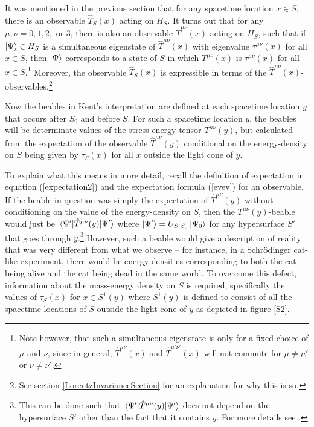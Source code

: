 It was mentioned in the previous section that for any spacetime location $x\in S$, there is an observable $\hat{T}_S(x)$ acting on $H_S$. It turns out that for any $\mu, \nu=0,1,2,$ or $3$, there is also an observable  $\hat{T}^{\mu\nu}(x)$ acting on $H_S$, such that if $\ket{\Psi}\in H_S$ is a simultaneous eigenstate of $\hat{T}^{\mu\nu}(x)$ with eigenvalue $\tau^{\mu\nu}(x)$ for all $x\in S$, then $\ket{\Psi}$ corresponds to a state of $S$ in which $T^{\mu\nu}(x)$ is  $\tau^{\mu\nu}(x)$ for all $x\in S$.\footnote{Note however, that such a simultaneous eigenstate is only for a fixed choice of $\mu$ and $\nu$, since in general, $\hat{T}^{\mu\nu}(x)$ and $\hat{T}^{\mu'\nu'}(x)$ will not commute for $\mu\neq\mu'$ or $\nu\neq\nu'$. } Moreover, the observable $\hat{T}_S(x)$ is expressible in terms of the  $\hat{T}^{\mu\nu}(x)$-observables.\footnote{See section  \ref{LorentzInvarianceSection} for an explanation for why this is so.} 

Now the  beables in Kent's interpretation are defined at each spacetime location $y$ that occurs after $S_0$ and before $S$. For such a spacetime location $y$, the beables will be determinate values of the stress-energy tensor $T^{\mu\nu}(y)$, but calculated from the expectation of the observable $\hat{T}^{\mu\nu}(y)$ conditional on the energy-density on $S$ being given by $\tau_S(x)$ for all $x$ outside the light cone of $y$. 

To explain what this means in more detail, recall the definition of expectation in equation (\ref{expectation2}) and the expectation formula (\ref{evev}) for an observable. If the beable in question was simply the expectation of $\hat{T}^{\mu\nu}(y)$ without conditioning on the value of the energy-density on $S$, then the $T^{\mu\nu}(y)$-beable would just be $\ev*{\hat{T}^{\mu\nu}(y)}{\Psi'}$ where $\ket{\Psi'}=U_{S'S_0}\ket{\Psi_0}$ for any hypersurface $S'$ that goes through $y$.\footnote{This can be done such that $\ev*{\hat{T}^{\mu\nu}(y)}{\Psi'}$ does not depend on the hypersurface $S'$ other than the fact that it contains $y$. For more details see \cite{SchwingerJulianI}.} However, such a beable would give a description of reality that was very different from what we observe -- for instance, in a Schr\"{o}dinger cat-like experiment, there would be energy-densities corresponding to both the cat being alive and the cat being dead in the same world. To overcome this defect, information about the mass-energy density on $S$ is required, specifically the values of $\tau_S(x)$ for $x\in S^1(y)$ where  $S^1(y)$ is defined to consist of all the spacetime locations of $S$ outside the light cone of $y$ as depicted in figure \ref{S2}.  



